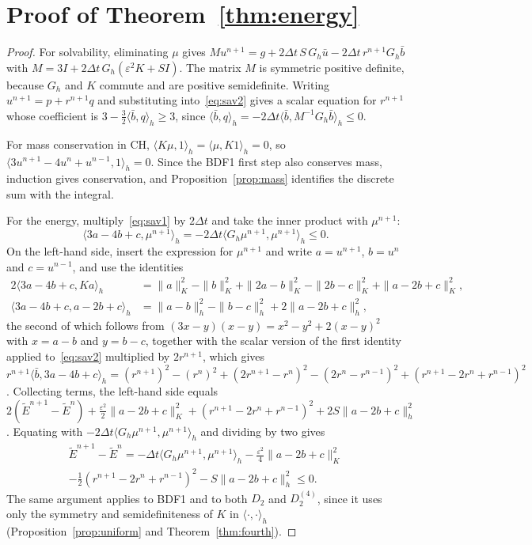\documentclass[preprint,12pt]{elsarticle}
\theoremstyle{remark}
\begin{document}
\section{Proof of Theorem~\ref{thm:energy}}\label{app:energy}
\begin{proof}
For solvability, eliminating $\mu$ gives $Mu^{n+1}=g+2\Delta t\,S\,G_h\bar u-2\Delta t\,r^{n+1}G_h\bar b$
with $M=3I+2\Delta t\,G_h(\varepsilon^2K+SI)$. The matrix $M$ is symmetric positive definite, because $G_h$
and $K$ commute and are positive semidefinite. Writing $u^{n+1}=p+r^{n+1}q$ and substituting
into~\eqref{eq:sav2} gives a scalar equation for $r^{n+1}$ whose coefficient is
$3-\tfrac32\langle\bar b,q\rangle_h\ge3$, since
$\langle\bar b,q\rangle_h=-2\Delta t\langle\bar b,M^{-1}G_h\bar b\rangle_h\le0$.

For mass conservation in CH, $\langle K\mu,1\rangle_h=\langle\mu,K1\rangle_h=0$, so
$\langle3u^{n+1}-4u^n+u^{n-1},1\rangle_h=0$. Since the BDF1 first step also conserves mass, induction gives
conservation, and Proposition~\ref{prop:mass} identifies the discrete sum with the integral.

For the energy, multiply~\eqref{eq:sav1} by $2\Delta t$ and take the inner product with $\mu^{n+1}$:
\[
\langle3a-4b+c,\mu^{n+1}\rangle_h=-2\Delta t\langle G_h\mu^{n+1},\mu^{n+1}\rangle_h\le0 .
\]
On the left-hand side, insert the expression for $\mu^{n+1}$ and write $a=u^{n+1}$, $b=u^n$ and
$c=u^{n-1}$, and use the identities
\begin{align*}
2\langle3a-4b+c,Ka\rangle_h&=\|a\|_K^2-\|b\|_K^2+\|2a-b\|_K^2-\|2b-c\|_K^2+\|a-2b+c\|_K^2,\\
\langle3a-4b+c,a-2b+c\rangle_h&=\|a-b\|_h^2-\|b-c\|_h^2+2\|a-2b+c\|_h^2,
\end{align*}
the second of which follows from $(3x-y)(x-y)=x^2-y^2+2(x-y)^2$ with $x=a-b$ and $y=b-c$, together with
the scalar version of the first identity applied to~\eqref{eq:sav2} multiplied by $2r^{n+1}$, which gives
$r^{n+1}\langle\bar b,3a-4b+c\rangle_h=(r^{n+1})^2-(r^n)^2+(2r^{n+1}-r^n)^2-(2r^n-r^{n-1})^2+(r^{n+1}-2r^n+r^{n-1})^2$.
Collecting terms, the left-hand side equals
$2(\tilde E^{n+1}-\tilde E^n)+\tfrac{\varepsilon^2}{2}\|a-2b+c\|_K^2+(r^{n+1}-2r^n+r^{n-1})^2+2S\|a-2b+c\|_h^2$.
Equating with $-2\Delta t\langle G_h\mu^{n+1},\mu^{n+1}\rangle_h$ and dividing by two gives
\begin{multline*}
\tilde E^{n+1}-\tilde E^n=-\Delta t\langle G_h\mu^{n+1},\mu^{n+1}\rangle_h-\tfrac{\varepsilon^2}{4}\|a-2b+c\|_K^2\\
-\tfrac12(r^{n+1}-2r^n+r^{n-1})^2-S\|a-2b+c\|_h^2\le0.
\end{multline*}
The same argument applies to BDF1 and to both $D_2$ and $D_2^{(4)}$, since it uses only the symmetry and
semidefiniteness of $K$ in $\langle\cdot,\cdot\rangle_h$ (Proposition~\ref{prop:uniform} and
Theorem~\ref{thm:fourth}).
\end{proof}
\end{document}

